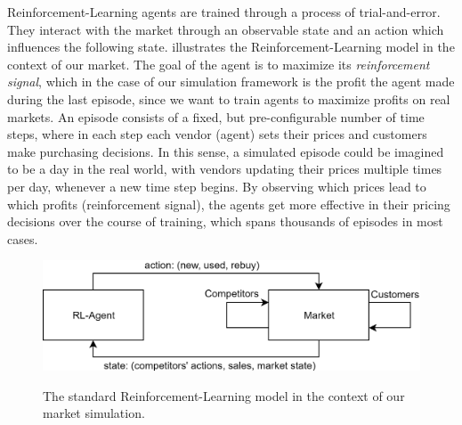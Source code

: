 Reinforcement-Learning agents are trained through a process of trial-and-error. They interact with the market through an observable state and an action which influences the following state.  illustrates the Reinforcement-Learning model in the context of our market. The goal of the agent is to maximize its \emph{reinforcement signal}, which in the case of our simulation framework is the profit the agent made during the last episode, since we want to train agents to maximize profits on real markets. An episode consists of a fixed, but pre-configurable number of time steps, where in each step each vendor (agent) sets their prices and customers make purchasing decisions. In this sense, a simulated episode could be imagined to be a day in the real world, with vendors updating their prices multiple times per day, whenever a new time step begins. By observing which prices lead to which profits (reinforcement signal), the agents get more effective in their pricing decisions over the course of training, which spans thousands of episodes in most cases.

\begin{figure}[t]
	\centering
	\includegraphics[width = \textwidth]{images/RL_overview.png}\\
	\caption{The standard Reinforcement-Learning model in the context of our market simulation.}\label{fig:IntroRLDiagram}
\end{figure}
